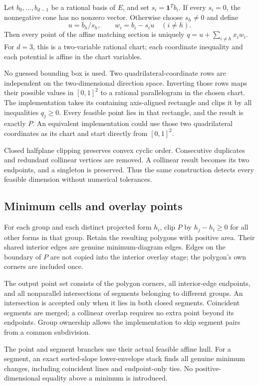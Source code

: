 \documentclass[11pt,letterpaper]{article}
\theoremstyle{definition}
\theoremstyle{remark}\newtheorem{remark}[theorem]{Remark}
\begin{document}
Let $b_0,\ldots,b_{d-1}$ be a rational basis of $E$, and set
$s_i=\mathbf1^Tb_i$. If every $s_i=0$, the nonnegative cone has no
nonzero vector. Otherwise choose $s_h\ne0$ and define
\[
 u=b_h/s_h,\qquad w_i=b_i-s_i u\quad(i\ne h).
\]
Then every point of the affine matching section is uniquely
$q=u+\sum_{i\ne h}x_iw_i$. For $d=3$, this is a two-variable rational
chart; each coordinate inequality and each potential is affine in the
chart variables.

No guessed bounding box is used. Two quadrilateral-coordinate rows are
independent on the two-dimensional direction space. Inverting those rows
maps their possible values in $[0,1]^2$ to a rational parallelogram in the
chosen chart. The implementation takes its containing axis-aligned
rectangle and clips it by all inequalities $q_j\ge0$. Every feasible point
lies in that rectangle, and the result is exactly $P$. An equivalent
implementation could use those two quadrilateral coordinates as its chart
and start directly from $[0,1]^2$.

Closed halfplane clipping preserves convex cyclic order. Consecutive
duplicates and redundant collinear vertices are removed. A collinear
result becomes its two endpoints, and a singleton is preserved. Thus the
same construction detects every feasible dimension without numerical
tolerances.

\subsection{Minimum cells and overlay points}

For each group and each distinct projected form $h_i$, clip $P$ by
$h_j-h_i\ge0$ for all other forms in that group. Retain the resulting
polygons with positive area. Their shared interior edges are genuine
minimum-diagram edges. Edges on the boundary of $P$ are not copied into
the interior overlay stage; the polygon's own corners are included once.

The output point set consists of the polygon corners, all interior-edge
endpoints, and all nonparallel intersections of segments belonging to
different groups. An intersection is accepted only when it lies in both
closed segments. Coincident segments are merged; a collinear overlap
requires no extra point beyond its endpoints. Group ownership allows the
implementation to skip segment pairs from a common subdivision.

The point and segment branches use their actual feasible affine hull.
For a segment, an exact sorted-slope lower-envelope stack finds all genuine
minimum changes, including coincident lines and endpoint-only ties. No
positive-dimensional equality above a minimum is introduced.
\end{document}
